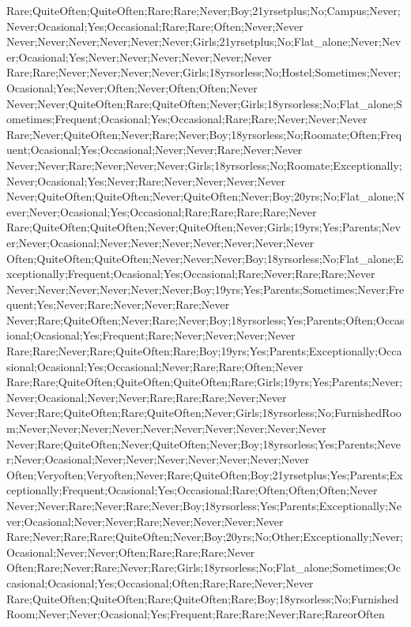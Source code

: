 Rare;QuiteOften;QuiteOften;Rare;Rare;Never;Boy;21yrsetplus;No;Campus;Never;Never;Ocasional;Yes;Occasional;Rare;Rare;Often;Never;Never
Never;Never;Never;Never;Never;Never;Girls;21yrsetplus;No;Flat_alone;Never;Never;Ocasional;Yes;Never;Never;Never;Never;Never;Never
Rare;Rare;Never;Never;Never;Never;Girls;18yrsorless;No;Hostel;Sometimes;Never;Ocasional;Yes;Never;Often;Never;Often;Often;Never
Never;Never;QuiteOften;Rare;QuiteOften;Never;Girls;18yrsorless;No;Flat_alone;Sometimes;Frequent;Ocasional;Yes;Occasional;Rare;Rare;Never;Never;Never
Rare;Never;QuiteOften;Never;Rare;Never;Boy;18yrsorless;No;Roomate;Often;Frequent;Ocasional;Yes;Occasional;Never;Never;Rare;Never;Never
Never;Never;Rare;Never;Never;Never;Girls;18yrsorless;No;Roomate;Exceptionally;Never;Ocasional;Yes;Never;Rare;Never;Never;Never;Never
Never;QuiteOften;QuiteOften;Never;QuiteOften;Never;Boy;20yrs;No;Flat_alone;Never;Never;Ocasional;Yes;Occasional;Rare;Rare;Rare;Rare;Never
Rare;QuiteOften;QuiteOften;Never;QuiteOften;Never;Girls;19yrs;Yes;Parents;Never;Never;Ocasional;Never;Never;Never;Never;Never;Never;Never
Often;QuiteOften;QuiteOften;Never;Never;Never;Boy;18yrsorless;No;Flat_alone;Exceptionally;Frequent;Ocasional;Yes;Occasional;Rare;Never;Rare;Rare;Never
Never;Never;Never;Never;Never;Never;Boy;19yrs;Yes;Parents;Sometimes;Never;Frequent;Yes;Never;Rare;Never;Never;Rare;Never
Never;Rare;QuiteOften;Never;Rare;Never;Boy;18yrsorless;Yes;Parents;Often;Occasional;Ocasional;Yes;Frequent;Rare;Never;Never;Never;Never
Rare;Rare;Never;Rare;QuiteOften;Rare;Boy;19yrs;Yes;Parents;Exceptionally;Occasional;Ocasional;Yes;Occasional;Never;Rare;Rare;Often;Never
Rare;Rare;QuiteOften;QuiteOften;QuiteOften;Rare;Girls;19yrs;Yes;Parents;Never;Never;Ocasional;Never;Never;Rare;Rare;Rare;Never;Never
Never;Rare;QuiteOften;Rare;QuiteOften;Never;Girls;18yrsorless;No;FurnishedRoom;Never;Never;Never;Never;Never;Never;Never;Never;Never;Never
Never;Rare;QuiteOften;Never;QuiteOften;Never;Boy;18yrsorless;Yes;Parents;Never;Never;Ocasional;Never;Never;Never;Never;Never;Never;Never
Often;Veryoften;Veryoften;Never;Rare;QuiteOften;Boy;21yrsetplus;Yes;Parents;Exceptionally;Frequent;Ocasional;Yes;Occasional;Rare;Often;Often;Often;Never
Never;Never;Rare;Never;Rare;Never;Boy;18yrsorless;Yes;Parents;Exceptionally;Never;Ocasional;Never;Never;Rare;Never;Never;Never;Never
Rare;Never;Rare;Rare;QuiteOften;Never;Boy;20yrs;No;Other;Exceptionally;Never;Ocasional;Never;Never;Often;Rare;Rare;Rare;Never
Often;Rare;Never;Rare;Never;Rare;Girls;18yrsorless;No;Flat_alone;Sometimes;Occasional;Ocasional;Yes;Occasional;Often;Rare;Rare;Never;Never
Rare;QuiteOften;QuiteOften;Rare;QuiteOften;Rare;Boy;18yrsorless;No;FurnishedRoom;Never;Never;Ocasional;Yes;Frequent;Rare;Rare;Never;Rare;RareorOften

